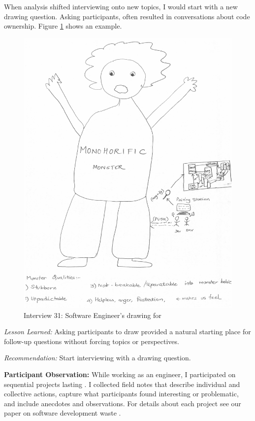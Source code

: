 When analysis shifted interviewing onto new topics, I would start with a new drawing question. Asking participants,  often resulted in conversations about code ownership. Figure \ref{Interview31} shows an example. 

\begin{figure}[htbp]
\centering
\includegraphics[width=\oneColumnWidth{}]{drawings/2016_09_26.png}
\caption{Interview 31: Software Engineer's drawing for }
\label{Interview31}
\end{figure}

\textit{Lesson Learned:} Asking participants to draw provided a natural starting place for follow-up questions without forcing topics or perspectives.

\textit{Recommendation:} Start interviewing with a  drawing question.

\textbf{Participant Observation:} While working as an engineer, I participated on \numberOfObservedProjects{} sequential projects lasting \durationOfResearchStudyPlural{}. I collected field notes that describe individual and collective actions, capture what participants found interesting or problematic, and include anecdotes and observations. For details about each project see our paper on software development waste \cite{SedanoSoftwareDevelopmentWaste}.

